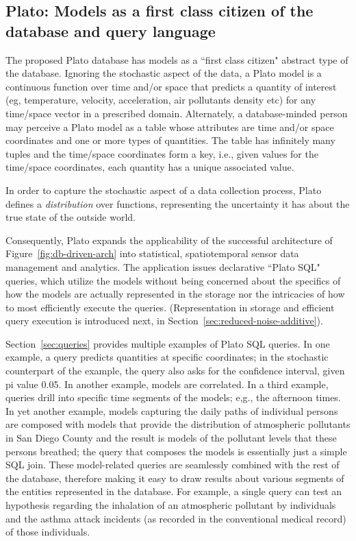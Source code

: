 \subsection{Plato: Models as a first class citizen of the database and query language}
\label{sec:plato}
The proposed Plato database has models as a ``first class citizen"
abstract type of the database. Ignoring the stochastic aspect of the
data, a Plato model is a continuous function over time and/or space
that predicts a quantity of interest (eg, temperature, velocity,
acceleration, air pollutants density etc) for any time/space vector in
a prescribed domain. Alternately, a database-minded person may
perceive a Plato model as a table whose attributes are time and/or
space coordinates and one or more types of quantities. The table has
infinitely many tuples and the time/space coordinates form a key,
i.e., given values for the time/space coordinates, each quantity has a
unique associated value.  

In order to capture the stochastic aspect of a data collection
process, Plato defines a {\em distribution} over functions,
representing the uncertainty it has about the true state of the
outside world.


Consequently, Plato expands the applicability of the successful
architecture of Figure~\ref{fig:db-driven-arch} into statistical,
spatiotemporal sensor data management and analytics. The application
issues declarative ``Plato SQL" queries, which utilize the models
without being concerned about the specifics of how the models are
actually represented in the storage nor the intricacies of how to most
efficiently execute the queries. (Representation in storage and
efficient query execution is introduced next, in
Section~\ref{sec:reduced-noise-additive}). 

Section~\ref{sec:queries} provides multiple examples of Plato SQL queries. In one example, a query predicts quantities at specific coordinates; in the stochastic counterpart of the example, the query also asks for the confidence interval, given pi value 0.05. In another example, models are correlated. In a third example, queries drill into specific time segments of the models; e,g., the afternoon times. In yet another example, models capturing the daily paths of individual persons are composed with models that provide the distribution of atmospheric pollutants in San Diego County and the result is models of the pollutant levels that these persons breathed; the query that composes the models is essentially just a simple SQL join. These model-related queries are seamlessly combined with the rest of the database, therefore making it easy to draw results about various segments of the entities represented in the database. For example, a single query can test an hypothesis regarding the inhalation of an atmospheric pollutant by individuals and the asthma attack incidents (as recorded in the conventional medical record) of those individuals.

